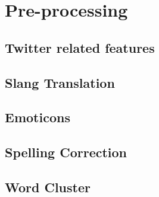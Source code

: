 \section{Pre-processing}
\subsection{Twitter related features}
\subsection{Slang Translation}
\subsection{Emoticons}
\subsection{Spelling Correction}
\subsection{Word Cluster}